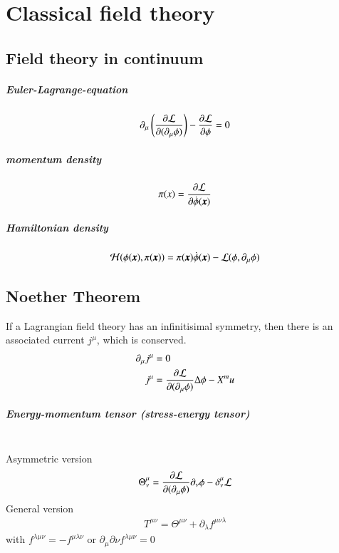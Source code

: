 \chapter{Classical field theory}
\section{Field theory in continuum}
\paragraph{Euler-Lagrange-equation}
\begin{align}
	\partial_\mu \left( \frac{\partial \mathcal{L}}{\partial(\partial_\mu \phi)} \right) - \frac{\partial \mathcal{L}}{\partial \phi} = 0
\end{align}
\paragraph{momentum density}
\begin{align}
	\pi(x) = \frac{\partial \mathcal{L}}{\partial \dot{\phi}(\pmb{x})}
\end{align}
\paragraph{Hamiltonian density}
\begin{align}
	\mathcal{H}(\phi(\pmb{x}),\pi(\pmb{x})) = \pi(\pmb{x}) \dot{\phi}(\pmb{x}) - \mathcal{L}(\phi,\partial_\mu \phi)
\end{align}
\section{Noether Theorem}
If a Lagrangian field theory has an infinitisimal symmetry, then there is an associated current $j^\mu$, which is conserved.
\begin{align}
	\partial_\mu j^\mu &= 0 \\
	j^\mu &= \frac{\partial \mathcal{L}}{\partial (\partial_\mu \phi)} \Delta \phi - X^mu
\end{align}
\paragraph{Energy-momentum tensor (stress-energy tensor)} \hspace{0pt}\\
Asymmetric version
\begin{align}
	\Theta^\mu_\nu = \frac{\partial \mathcal{L}}{\partial(\partial_\mu \phi)} \partial_\nu \phi - \delta^\mu_\nu \mathcal{L}
\end{align}
General version
\begin{align}
	T^{\mu\nu} = \Theta^{\mu\nu} + \partial_\lambda f^{\mu\nu\lambda}
\end{align}
with $f^{\lambda\mu\nu}=-f^{\mu\lambda\nu}$ or $\partial_\mu \partial\nu f^{\lambda\mu\nu}=0$

